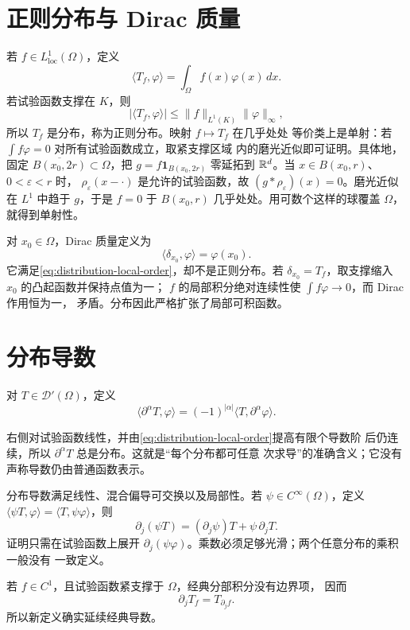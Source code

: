 \section{正则分布与 Dirac 质量}

若 \(f\in L^1_{\mathrm{loc}}(\Omega)\)，定义
\[
 \langle T_f,\varphi\rangle=\int_\Omega f(x)\varphi(x)\,dx.
\]
若试验函数支撑在 \(K\)，则
\[
 |\langle T_f,\varphi\rangle|
 \le\|f\|_{L^1(K)}\|\varphi\|_\infty,
\]
所以 \(T_f\) 是分布，称为正则分布。映射 \(f\mapsto T_f\) 在几乎处处
等价类上是单射：若 \(\int f\varphi=0\) 对所有试验函数成立，取紧支撑区域
内的磨光近似即可证明。具体地，固定
\(\overline{B(x_0,2r)}\subset\Omega\)，把
\(g=f\mathbf1_{B(x_0,2r)}\) 零延拓到 \(\mathbb{R}^d\)。当
\(x\in B(x_0,r)\)、\(0<\varepsilon<r\) 时，
\(\rho_\varepsilon(x-\cdot)\) 是允许的试验函数，故
\((g*\rho_\varepsilon)(x)=0\)。磨光近似在 \(L^1\) 中趋于 \(g\)，于是
\(f=0\) 于 \(B(x_0,r)\) 几乎处处。用可数个这样的球覆盖 \(\Omega\)，
就得到单射性。

对 \(x_0\in\Omega\)，Dirac 质量定义为
\[
 \langle\delta_{x_0},\varphi\rangle=\varphi(x_0).
\]
它满足\eqref{eq:distribution-local-order}，却不是正则分布。若
\(\delta_{x_0}=T_f\)，取支撑缩入 \(x_0\) 的凸起函数并保持点值为一；
\(f\) 的局部积分绝对连续性使 \(\int f\varphi\to0\)，而 Dirac 作用恒为一，
矛盾。分布因此严格扩张了局部可积函数。

\section{分布导数}

\begin{definition}
对 \(T\in\mathcal D'(\Omega)\)，定义
\[
 \langle\partial^\alpha T,\varphi\rangle
 =(-1)^{|\alpha|}\langle T,\partial^\alpha\varphi\rangle.
\]
\end{definition}
右侧对试验函数线性，并由\eqref{eq:distribution-local-order}提高有限个导数阶
后仍连续，所以 \(\partial^\alpha T\) 总是分布。这就是“每个分布都可任意
次求导”的准确含义；它没有声称导数仍由普通函数表示。

分布导数满足线性、混合偏导可交换以及局部性。若
\(\psi\in C^\infty(\Omega)\)，定义
\(\langle\psi T,\varphi\rangle=\langle T,\psi\varphi\rangle\)，则
\[
 \partial_j(\psi T)=(\partial_j\psi)T+\psi\,\partial_jT.
\]
证明只需在试验函数上展开
\(\partial_j(\psi\varphi)\)。乘数必须足够光滑；两个任意分布的乘积一般没有
一致定义。

若 \(f\in C^1\)，且试验函数紧支撑于 \(\Omega\)，经典分部积分没有边界项，
因而
\[
 \partial_jT_f=T_{\partial_jf}.
\]
所以新定义确实延续经典导数。

